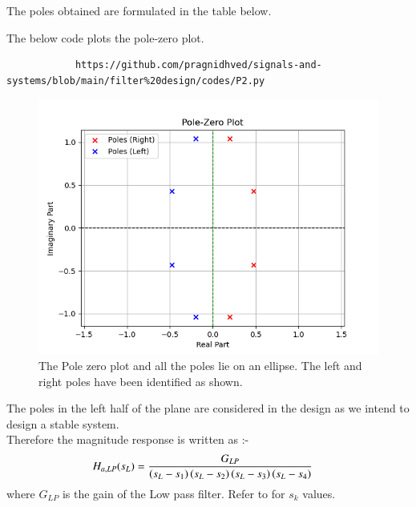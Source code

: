 \documentclass{article}
\begin{document}
\begin{enumerate}
		The poles obtained are formulated in the table below.
		
		The below code plots the pole-zero plot.
		\begin{lstlisting}
			https://github.com/pragnidhved/signals-and-systems/blob/main/filter%20design/codes/P2.py
		\end{lstlisting}
		\newpage
		\begin{figure}[htbp]
			\centering
			\includegraphics[width=1\linewidth]{figs/fig2}
			\caption{The Pole zero plot and all the poles lie on an ellipse. The left and right poles have been identified as shown.}
			\label{fig:pole_zero_plt}
		\end{figure}
		The poles in the left half of the plane are considered in the design as we intend to design a stable system.\\
		Therefore the magnitude response is written as :- 
		\begin{align}
			H_{a,LP}(s_L) &= \frac{G_{LP}}{\left(s_L-s_1\right)\left(s_L-s_2\right)\left(s_L-s_3\right)\left(s_L-s_4\right)}
		\end{align}
		where $G_{LP}$ is the gain of the Low pass filter. Refer to  for $s_k$ values.\\
		

\end{enumerate}
\end{document}
